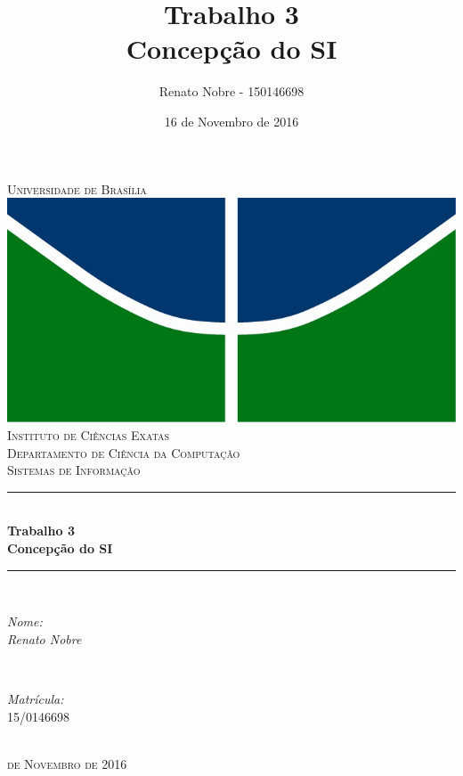 \documentclass[a4paper, 12pt]{article}
\author[]{Renato Nobre - 150146698}
\affil[]{Sistemas de Informação\\Universidade de Brasília}
\title{Trabalho 3\\Concepção do SI}
\date{16 de Novembro de 2016}
\begin{document}
	\begin{titlepage}

		\newcommand{\HRule}{\rule{\linewidth}{0.5mm}}
		\centering
	    \textsc{\LARGE Universidade de Brasília}\\[0.5cm]
	    \includegraphics{logo.jpg}\\[0.5cm]
		\textsc{\Large Instituto de Ciências Exatas}\\[0.5cm]
	    \textsc{\Large Departamento de Ciência da Computação}\\[0.5cm]
		\textsc{\Large Sistemas de Informação}\\[0.5cm]
	    \HRule \\[0.2cm]
	    { \huge \bfseries Trabalho 3\\[0.5cm] Concepção do SI}\\
	      \HRule \\[1.5cm]
	      	\begin{minipage}{0.4\textwidth}
	      		\begin{flushleft} \large
	      			\emph{Nome:}\\
					\emph{Renato Nobre}\\
	      		\end{flushleft}
	      	\end{minipage}
	      	~
	      	\begin{minipage}{0.4\textwidth}
	      		\begin{flushright} \large
	      			\emph{Matrícula:}\\
	       			\textsc{15/0146698}\\
	      		\end{flushright}
	      	\end{minipage}\\[8.5cm]
		\textsc{\large {} de Novembro de 2016}\\
	\end{titlepage}
\end{document}
